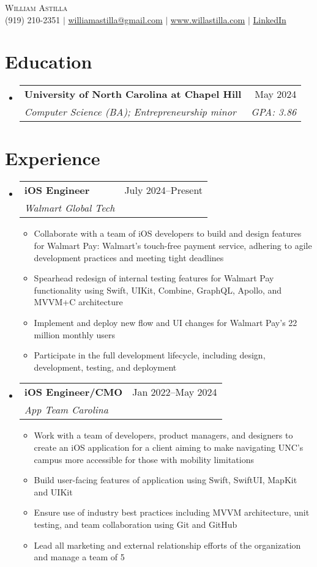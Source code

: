 \documentclass[letterpaper,11pt]{article}
\makeatletter
\newcommand{\resumeItem}[1]{
  \item\small{{#1}}
}
\newcommand{\resumeExperience}[4]{
  \vspace{-2pt}\item
    \begin{tabular*}{0.97\textwidth}[t]{l@{\extracolsep{\fill}}r}
      \textbf{#1} & #2 \\
      \textit{#3} & \textit{#4} \\
    \end{tabular*}
}
\newcommand{\resumeSubheading}[4]{
  \vspace{-2pt}\item
    \begin{tabular*}{0.97\textwidth}[t]{l@{\extracolsep{\fill}}r}
      \textbf{#1} & #2 \\
      \textit{\small#3} & \textit{\small #4} \\
    \end{tabular*}\vspace{-7pt}
}
\newcommand{\resumeSubHeadingListStart}{\begin{itemize}[leftmargin=0.15in, label={}]}
\newcommand{\resumeSubHeadingListEnd}{\end{itemize}}
\newcommand{\resumeItemListStart}{\begin{itemize}}
\newcommand{\resumeItemListEnd}{\end{itemize}\vspace{-5pt}}
\makeatother
\begin{document}
\begin{center}
    {\Huge \scshape William Astilla} \\ \vspace{2pt}
    \small
    (919) 210-2351 $|$ \href{mailto:williamastilla@gmail.com}{williamastilla@gmail.com} $|$ \href{https://www.willastilla.com}{www.willastilla.com} $|$ \href{https://www.linkedin.com/in/willastilla}{LinkedIn}
\end{center}

\section{Education}
  \resumeSubHeadingListStart
    \resumeSubheading
      {University of North Carolina at Chapel Hill}{May 2024}
      {Computer Science (BA); Entrepreneurship minor}{\textit{GPA: 3.86}}
  \resumeSubHeadingListEnd

\section{Experience}
  \resumeSubHeadingListStart
    \resumeExperience
      {iOS Engineer}{July 2024--Present}{Walmart Global Tech}{ }
      \resumeItemListStart
        \resumeItem{Collaborate with a team of iOS developers to build and design features for Walmart Pay: Walmart's touch-free payment service, adhering to agile development practices and meeting tight deadlines}
        \resumeItem{Spearhead redesign of internal testing features for Walmart Pay functionality using Swift, UIKit, Combine, GraphQL, Apollo, and MVVM+C architecture}
        \resumeItem{Implement and deploy new flow and UI changes for Walmart Pay's 22 million monthly users}
        \resumeItem{Participate in the full development lifecycle, including design, development, testing, and deployment}
      \resumeItemListEnd
    \resumeExperience
      {iOS Engineer/CMO}{Jan 2022--May 2024}{App Team Carolina}{ }
      \resumeItemListStart
        \resumeItem{Work with a team of developers, product managers, and designers to create an iOS application for a client aiming to make navigating UNC's campus more accessible for those with mobility limitations}
        \resumeItem{Build user-facing features of application using Swift, SwiftUI, MapKit and UIKit}
        \resumeItem{Ensure use of industry best practices including MVVM architecture, unit testing, and team collaboration using Git and GitHub}
        \resumeItem{Lead all marketing and external relationship efforts of the organization and manage a team of 5}
      \resumeItemListEnd
  \resumeSubHeadingListEnd
\end{document}
